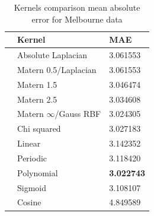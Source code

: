 \begin{table}[!h]
    \caption{Kernels comparison mean absolute error for Melbourne data}
    \label{tab:kernel mae comparison}
    \begin{center}
    \begin{tabular}{lll}
        \toprule
         & Kernel & MAE \\
        \midrule
        & Absolute Laplacian &  3.061553 \\
        & Matern 0.5/Laplacian &  3.061553 \\
        & Matern 1.5 &  3.046474 \\
        & Matern 2.5 &  3.034608 \\
        & Matern $\infty$/Gauss RBF &  3.024305 \\
        & Chi squared &    3.027183    \\
        & Linear &     3.142352\\
        & Periodic  & 3.118420 \\
        & Polynomial &     \textbf{3.022743} \\
        & Sigmoid &      3.108107       \\
        & Cosine &    4.849589 \\
        \bottomrule
        \end{tabular}
    \end{center}
    \end{table}  



